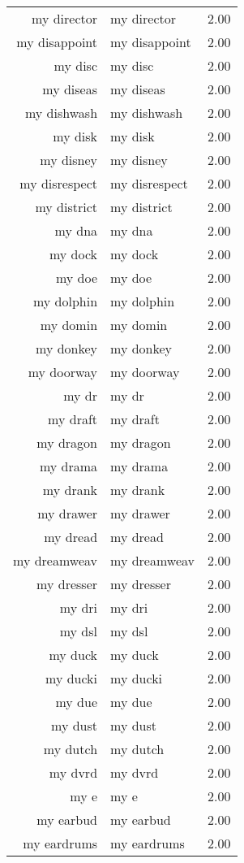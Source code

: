 \begin{table}[ht]
\begin{tabular}{rlr}
  my director & my director & 2.00 \\ 
  my disappoint & my disappoint & 2.00 \\ 
  my disc & my disc & 2.00 \\ 
  my diseas & my diseas & 2.00 \\ 
  my dishwash & my dishwash & 2.00 \\ 
  my disk & my disk & 2.00 \\ 
  my disney & my disney & 2.00 \\ 
  my disrespect & my disrespect & 2.00 \\ 
  my district & my district & 2.00 \\ 
  my dna & my dna & 2.00 \\ 
  my dock & my dock & 2.00 \\ 
  my doe & my doe & 2.00 \\ 
  my dolphin & my dolphin & 2.00 \\ 
  my domin & my domin & 2.00 \\ 
  my donkey & my donkey & 2.00 \\ 
  my doorway & my doorway & 2.00 \\ 
  my dr & my dr & 2.00 \\ 
  my draft & my draft & 2.00 \\ 
  my dragon & my dragon & 2.00 \\ 
  my drama & my drama & 2.00 \\ 
  my drank & my drank & 2.00 \\ 
  my drawer & my drawer & 2.00 \\ 
  my dread & my dread & 2.00 \\ 
  my dreamweav & my dreamweav & 2.00 \\ 
  my dresser & my dresser & 2.00 \\ 
  my dri & my dri & 2.00 \\ 
  my dsl & my dsl & 2.00 \\ 
  my duck & my duck & 2.00 \\ 
  my ducki & my ducki & 2.00 \\ 
  my due & my due & 2.00 \\ 
  my dust & my dust & 2.00 \\ 
  my dutch & my dutch & 2.00 \\ 
  my dvrd & my dvrd & 2.00 \\ 
  my e & my e & 2.00 \\ 
  my earbud & my earbud & 2.00 \\ 
  my eardrums & my eardrums & 2.00 \\ 

\end{tabular}
\end{table}
